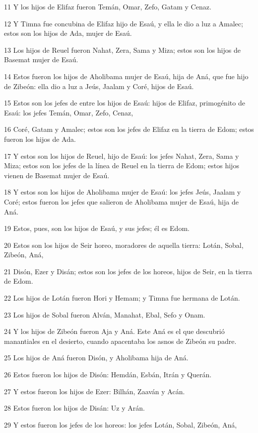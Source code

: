11 Y los hijos de Elifaz fueron Temán, Omar, Zefo, Gatam y Cenaz.

12 Y Timna fue concubina de Elifaz hijo de Esaú, y ella le dio a luz a Amalec; estos son los hijos de Ada, mujer de Esaú.

13 Los hijos de Reuel fueron Nahat, Zera, Sama y Miza; estos son los hijos de Basemat mujer de Esaú.

14 Estos fueron los hijos de Aholibama mujer de Esaú, hija de Aná, que fue hijo de Zibeón: ella dio a luz a Jeús, Jaalam y Coré, hijos de Esaú.

15 Estos son los jefes de entre los hijos de Esaú: hijos de Elifaz, primogénito de Esaú: los jefes Temán, Omar, Zefo, Cenaz,

16 Coré, Gatam y Amalec; estos son los jefes de Elifaz en la tierra de Edom; estos fueron los hijos de Ada.

17 Y estos son los hijos de Reuel, hijo de Esaú: los jefes Nahat, Zera, Sama y Miza; estos son los jefes de la línea de Reuel en la tierra de Edom; estos hijos vienen de Basemat mujer de Esaú.

18 Y estos son los hijos de Aholibama mujer de Esaú: los jefes Jeús, Jaalam y Coré; estos fueron los jefes que salieron de Aholibama mujer de Esaú, hija de Aná.

19 Estos, pues, son los hijos de Esaú, y sus jefes; él es Edom.

20 Estos son los hijos de Seir horeo, moradores de aquella tierra: Lotán, Sobal, Zibeón, Aná,

21 Disón, Ezer y Disán; estos son los jefes de los horeos, hijos de Seir, en la tierra de Edom.

22 Los hijos de Lotán fueron Hori y Hemam; y Timna fue hermana de Lotán.

23 Los hijos de Sobal fueron Alván, Manahat, Ebal, Sefo y Onam.

24 Y los hijos de Zibeón fueron Aja y Aná. Este Aná es el que descubrió manantiales en el desierto, cuando apacentaba los asnos de Zibeón su padre.

25 Los hijos de Aná fueron Disón, y Aholibama hija de Aná.

26 Estos fueron los hijos de Disón: Hemdán, Esbán, Itrán y Querán.

27 Y estos fueron los hijos de Ezer: Bilhán, Zaaván y Acán.

28 Estos fueron los hijos de Disán: Uz y Arán.

29 Y estos fueron los jefes de los horeos: los jefes Lotán, Sobal, Zibeón, Aná,

